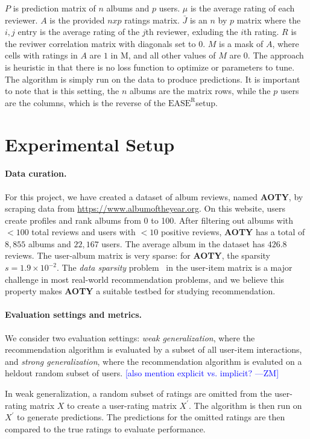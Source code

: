 \documentclass{article}
\newcommand{\aoty}{{\bf AOTY}\xspace}
\newcommand{\easer}{$\text{EASE}^\text{R}$}
\newcommand{\zander}[1]{\textcolor{blue}{[#1 ---\textsc{ZM}]}}
\begin{document}
$P$ is prediction matrix of $n$ albums and $p$ users. $\mu$ is the average rating
 of each reviewer. $A$ is the provided $nxp$ ratings matrix. $\bar J$ is an $n$ by $p$
 matrix where the $i,j$ entry is the average rating of the $j$th reviewer, exluding the $i$th
 rating. $R$ is the reviwer correlation matrix with diagonals set to 0. $M$ is a mask of
 $A$, where cells with ratings in $A$ are $1$ in M, and all other values of $M$ are 0. 
 The approach is heuristic in that there is no loss function to optimize or parameters
 to tune. The algorithm is simply run on the data to produce predictions. It is important
 to note that is this setting, the $n$ albums are the matrix rows, while the $p$ users 
 are the columns, which is the reverse of the \easer setup. 

\section{Experimental Setup}
\label{sec:setup}
\paragraph*{Data curation.}
For this project, we have created a dataset of album reviews, named \aoty, by
 scraping data from \url{https://www.albumoftheyear.org}.
On this website, users create profiles and rank albums from 0 to 100.
After filtering out albums with $<100$ total reviews and users with $<10$
 positive reviews, \aoty has a total of $8,855$ albums and $22,167$ users.
The average album in the dataset has $426.8$ reviews.
The user-album matrix is very sparse: for \aoty, the sparsity $s = 1.9 \times
	 10^{-2}$.
The {\em data sparsity} problem~\citep{suSurveyCollaborativeFiltering2009} in
 the user-item matrix is a major challenge in most real-world recommendation
 problems, and we believe this property makes \aoty a suitable testbed for
 studying recommendation.

\paragraph*{Evaluation settings and metrics.}
We consider two evaluation settings: {\em weak generalization}, where the
 recommendation algorithm is evaluated by a subset of all user-item
 interactions, and {\em strong generalization}, where the recommendation
 algorithm is evaluted on a heldout random subset of users. 
 \zander{also mention explicit vs. implicit?}

In weak generalization, a random subset of ratings are omitted from the user-rating
 matrix $X$ to create a user-rating matrix $X^{\prime}$. The algorithm is then run on 
 $X^{\prime}$ to generate predictions. The predictions for the omitted ratings are then 
 compared to the true ratings to evaluate performance.
\end{document}
